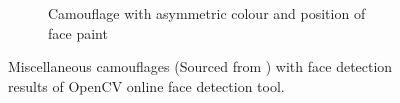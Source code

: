 \documentclass[10pt,twocolumn,letterpaper]{article}
\begin{document}
\begin{figure}[t]
\begin{subfigure}[b]{.49\linewidth}
        \caption{Camouflage with asymmetric colour and position of face paint}
        \label{fig:face-paint}
    \end{subfigure}
    
    \caption{Miscellaneous camouflages (Sourced from \cite{naruto,thug-life}) with face detection results of OpenCV online face detection tool.}
    \label{fig:others}
\end{figure}









\pagebreak

{\small


}
\end{document}

